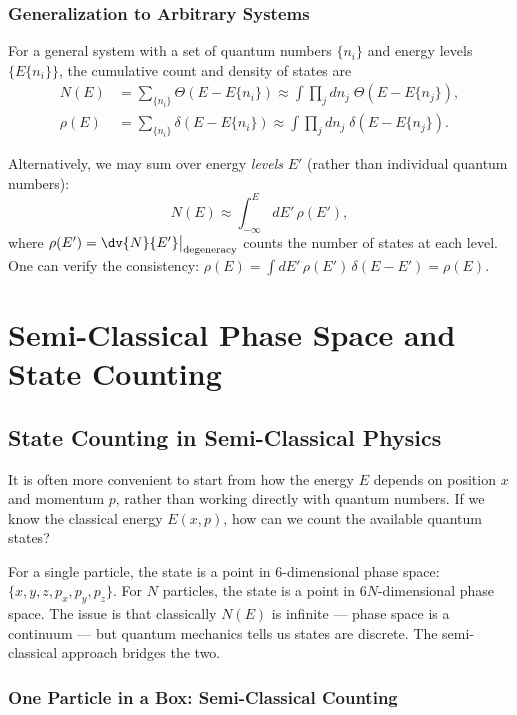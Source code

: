 \subsection{Generalization to Arbitrary Systems}

For a general system with a set of quantum numbers $\{n_i\}$ and energy levels $\{E\{n_i\}\}$, the cumulative count and density of states are
\begin{align}
    N(E) &= \sum_{\{n_i\}} \Theta(E - E\{n_i\}) \approx \int \prod_j dn_j\;\Theta(E - E\{n_j\}), \\
    \rho(E) &= \sum_{\{n_i\}} \delta(E - E\{n_i\}) \approx \int \prod_j dn_j\;\delta(E - E\{n_j\}).
\end{align}

Alternatively, we may sum over energy \emph{levels} $E'$ (rather than individual quantum numbers):
\begin{equation}
    N(E) \approx \int_{-\infty}^{E} dE'\,\rho(E'),
\end{equation}
where $\rho(E') = \dv{N}{E'}\big|_{\text{degeneracy}}$ counts the number of states at each level. One can verify the consistency: $\rho(E) = \int dE'\,\rho(E')\,\delta(E - E') = \rho(E)$. \checkmark


\chapter{Semi-Classical Phase Space and State Counting}

\section{State Counting in Semi-Classical Physics}

It is often more convenient to start from how the energy $E$ depends on position $x$ and momentum $p$, rather than working directly with quantum numbers. If we know the classical energy $E(x, p)$, how can we count the available quantum states?

For a single particle, the state is a point in 6-dimensional phase space: $\{x, y, z, p_x, p_y, p_z\}$. For $N$ particles, the state is a point in $6N$-dimensional phase space. The issue is that classically $N(E)$ is infinite — phase space is a continuum — but quantum mechanics tells us states are discrete. The semi-classical approach bridges the two.

\subsection{One Particle in a Box: Semi-Classical Counting}

